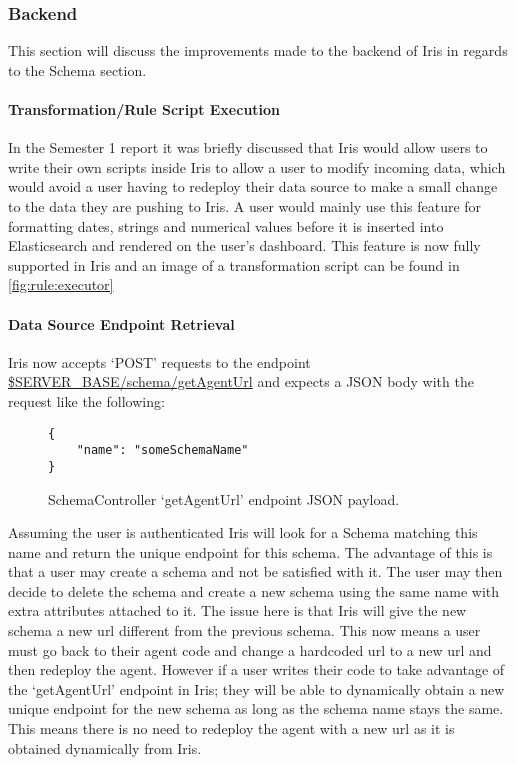 \documentclass[12pt,a4paper,titlepage]{report}
\begin{document}
\subsubsection{Backend}
This section will discuss the improvements made to the backend of Iris in regards to the Schema section.

\paragraph{Transformation/Rule Script Execution}
\label{para:rule:executor:backend}
In the Semester 1 report it was briefly discussed that Iris would allow users to write their own scripts inside Iris to allow a user to modify incoming data, which would avoid a user having to redeploy their data source to make a small change to the data they are pushing to Iris. A user would mainly use this feature for formatting dates, strings and numerical values before it is inserted into Elasticsearch and rendered on the user's dashboard. This feature is now fully supported in Iris and an image of a transformation script can be found in \cref{fig:rule:executor}

\paragraph{Data Source Endpoint Retrieval}
Iris now accepts `POST' requests to the endpoint \url{$SERVER_BASE/schema/getAgentUrl} and expects a JSON body with the request like the following:

\begin{figure}[H]
\begin{tcolorbox}
\begin{verbatim}
{
    "name": "someSchemaName"
}
\end{verbatim}
\end{tcolorbox}
\caption{SchemaController `getAgentUrl' endpoint JSON payload.}
\end{figure}
Assuming the user is authenticated Iris will look for a Schema matching this name and return the unique endpoint for this schema. The advantage of this is that a user may create a schema and not be satisfied with it. The user may then decide to delete the schema and create a new schema using the same name with extra attributes attached to it. The issue here is that Iris will give the new schema a new url different from the previous schema. This now means a user must go back to their agent code and change a hardcoded url to a new url and then redeploy the agent. However if a user writes their code to take advantage of the `getAgentUrl' endpoint in Iris; they will be able to dynamically obtain a new unique endpoint for the new schema as long as the schema name stays the same. This means there is no need to redeploy the agent with a new url as it is obtained dynamically from Iris.
\end{document}
